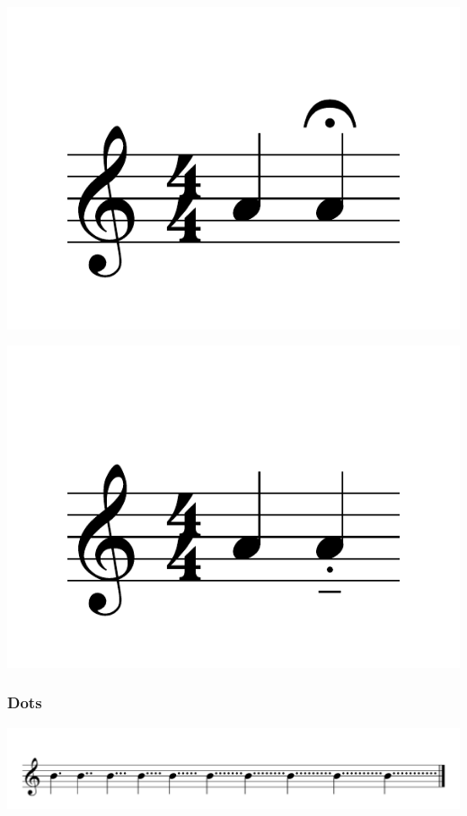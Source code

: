 \documentclass{article}
\begin{document}
\includegraphics[scale=0.5]{figures_tests/pdf/skern/articulations6.pdf}

\includegraphics[scale=0.5]{figures_tests/pdf/skern/articulations7.pdf}


\subsubsection{Dots}
\includegraphics[scale=0.35]{figures_tests/pdf/skern/augmentationDots.pdf}
\end{document}
